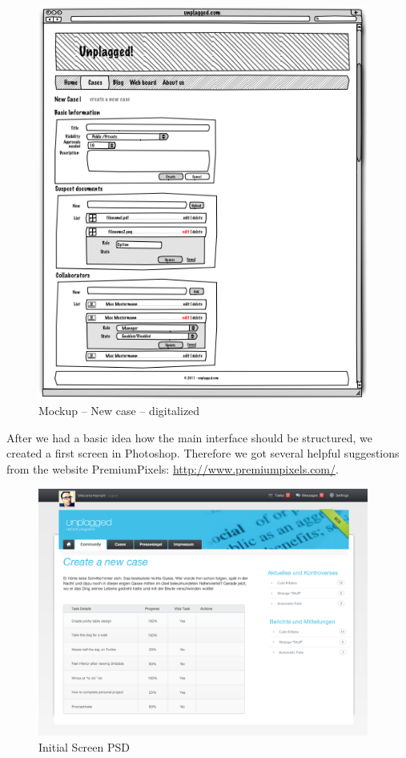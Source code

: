 \begin{figure}[htbp]
  \centering
    \includegraphics[width=0.97\textwidth , bb = 0 250 490 560,clip]{mockups/1_new_case.png}
  \caption{Mockup – New case – digitalized}
  \label{fig:1newCaseMockup}
\end{figure}


After we had a basic idea how the main interface should be structured, we created a first screen in Photoshop. Therefore we got several helpful suggestions from the website PremiumPixels: \url{http://www.premiumpixels.com/}.

\begin{figure}[htbp]
  \centering
    \includegraphics[width=0.97\textwidth]{images/init-psd.png}
  \caption{Initial Screen PSD}
  \label{fig:initialScreenPsd}
\end{figure}

